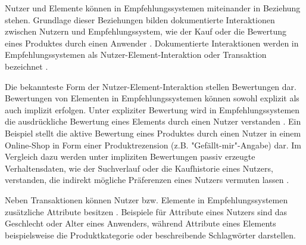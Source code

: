 Nutzer und Elemente können in Empfehlungssystemen miteinander in Beziehung stehen.
Grundlage dieser Beziehungen bilden dokumentierte Interaktionen zwischen Nutzern und Empfehlungssystem, wie der Kauf oder die Bewertung eines Produktes durch einen Anwender \cite[S. 8ff.]{ricci:inbook}.
Dokumentierte Interaktionen werden in Empfehlungssystemen als Nutzer-Element-Interaktion oder Transaktion bezeichnet \cite[S. 8]{recommenderSystems:2016}\cite[S. 9]{ricci:inbook}.

Die bekannteste Form der Nutzer-Element-Interaktion stellen Bewertungen dar.
Bewertungen von Elementen in Empfehlungssystemen können sowohl explizit als auch implizit erfolgen.
Unter expliziter Bewertung wird in Empfehlungssystemen die ausdrückliche Bewertung eines Elements durch einen Nutzer verstanden \cite[S. 9]{ricci:inbook}.
Ein Beispiel stellt die aktive Bewertung eines Produktes durch einen Nutzer in einem Online-Shop in Form einer Produktrezension (z.B. "Gefällt-mir"-Angabe) dar.
Im Vergleich dazu werden unter impliziten Bewertungen passiv erzeugte Verhaltensdaten, wie der Suchverlauf oder die Kaufhistorie eines Nutzers, verstanden, die indirekt mögliche Präferenzen eines Nutzers vermuten lassen \cite[S. 149]{jadidinejad:inproceedings}\cite[S. 403]{unternährer:article}.

Neben Transaktionen können Nutzer bzw. Elemente in Empfehlungssystemen zusätzliche Attribute besitzen \cite[S. 8]{recommenderSystems:2016}\cite[S. 735]{adomavicius:inproceedings}.
Beispiele für Attribute eines Nutzers sind das Geschlecht oder Alter eines Anwenders, während Attribute eines Elements beispielsweise die Produktkategorie oder beschreibende Schlagwörter darstellen.

